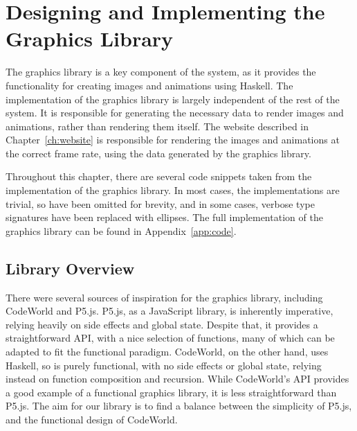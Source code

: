 \documentclass[../main.tex]{subfiles}
\begin{document}
\chapter{Designing and Implementing the Graphics Library} \label{ch:graphics}
    The graphics library is a key component of the system, as it provides the
        functionality for creating images and animations using Haskell.
    The implementation of the graphics library is largely independent of the rest
        of the system.
    It is responsible for generating the necessary data to render images and
        animations, rather than rendering them itself.
    The website described in Chapter~\ref{ch:website} is responsible for rendering
        the images and animations at the correct frame rate, using the data generated
        by the graphics library.

    Throughout this chapter, there are several code snippets taken from the
        implementation of the graphics library.
    In most cases, the implementations are trivial, so have been omitted for
        brevity, and in some cases, verbose type signatures have been replaced with
        ellipses.
    The full implementation of the graphics library can be found in
        Appendix~\ref{app:code}.

    \section{Library Overview}
        There were several sources of inspiration for the graphics library, including
            CodeWorld and P5.js.
        P5.js, as a JavaScript library, is inherently imperative, relying heavily on
            side effects and global state.
        Despite that, it provides a straightforward API, with a nice selection of
            functions, many of which can be adapted to fit the functional paradigm.
        CodeWorld, on the other hand, uses Haskell, so is purely functional, with no
            side effects or global state, relying instead on function composition and
            recursion.
        While CodeWorld's API provides a good example of a functional graphics library,
            it is less straightforward than P5.js.
        The aim for our library is to find a balance between the simplicity of P5.js,
            and the functional design of CodeWorld.
\end{document}
